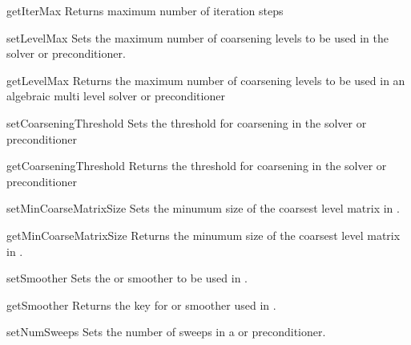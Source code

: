 \begin{methoddesc}[SolverOptions]{getIterMax}{}
Returns maximum number of iteration steps
\end{methoddesc}

\begin{methoddesc}[SolverOptions]{setLevelMax}{}
Sets the maximum number of coarsening levels to be used in the \AMG solver or preconditioner.
\end{methoddesc}

\begin{methoddesc}[SolverOptions]{getLevelMax}{}
Returns the maximum number of coarsening levels to be used in an algebraic multi level solver or preconditioner
\end{methoddesc}

\begin{methoddesc}[SolverOptions]{setCoarseningThreshold}{}
Sets the threshold for coarsening in the \AMG solver or preconditioner
\end{methoddesc}

\begin{methoddesc}[SolverOptions]{getCoarseningThreshold}{}
Returns the threshold for coarsening in the \AMG solver or preconditioner
\end{methoddesc}

\begin{methoddesc}[SolverOptions]{setMinCoarseMatrixSize}{}
Sets the minumum size of the coarsest level matrix in \AMG.
\end{methoddesc}

\begin{methoddesc}[SolverOptions]{getMinCoarseMatrixSize}{}
Returns the minumum size of the coarsest level matrix in \AMG.
\end{methoddesc}

\begin{methoddesc}[SolverOptions]{setSmoother}{}
Sets the \JACOBI or \GAUSSSEIDEL smoother to be used in \AMG.
\end{methoddesc}

\begin{methoddesc}[SolverOptions]{getSmoother}{}
Returns the key for \JACOBI or \GAUSSSEIDEL smoother used in \AMG.
\end{methoddesc}

\begin{methoddesc}[SolverOptions]{setNumSweeps}{}
Sets the number of sweeps in a \JACOBI or \GAUSSSEIDEL preconditioner.
\end{methoddesc}

